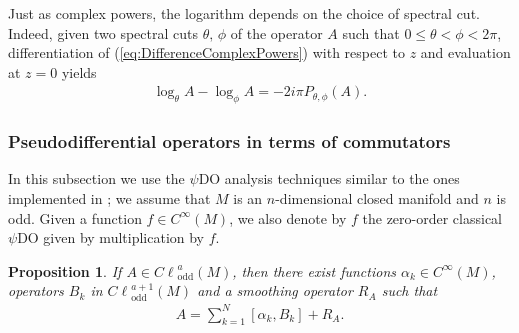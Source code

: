 \documentclass[11pt]{article}
\newtheorem{proposition}{Proposition}
\DeclareMathOperator{\odd}{odd} \DeclareMathOperator{\supp}{supp}
\def \Cl {{C\ell}}
\begin{document}
Just as complex powers, the logarithm depends on the choice of spectral cut. Indeed, given two spectral cuts $\theta,\, \phi$ of the operator $A$ such that $0\leq \theta <\phi <2\pi$, dif\/ferentiation of (\ref{eq:DifferenceComplexPowers}) with respect to $z$ and evaluation at $z=0$ yields
\begin{gather}
\log_\theta A-\log_\phi A=-2i\pi P_{\theta, \phi}(A). \label{eq:difflogarithms}
\end{gather}

\subsubsection{Pseudodif\/ferential operators in terms of commutators}

In this subsection we use the $\psi$DO analysis techniques similar to the ones implemented in \cite{maniccia}; we assume that $M$ is an $n$-dimensional closed manifold and $n$ is odd. Given a function $f\in C^\infty(M)$, we also denote by $f$ the zero-order classical $\psi$DO given by multiplication by $f$.
\begin{proposition}\label{prop:PDOsumComutators}
If $A\in\Cl^{a}_{\odd}(M)$, then there exist functions $\alpha_k\in C^\infty(M)$, operators $B_k$ in $\Cl^{a+1}_{\odd}(M)$ and a smoothing operator $R_A$ such that
\begin{gather}
A=\sum_{k=1}^N[\alpha_k,B_k]+R_A. \label{eq:PDOsumComutators}
\end{gather}
\end{proposition}
\end{document}
